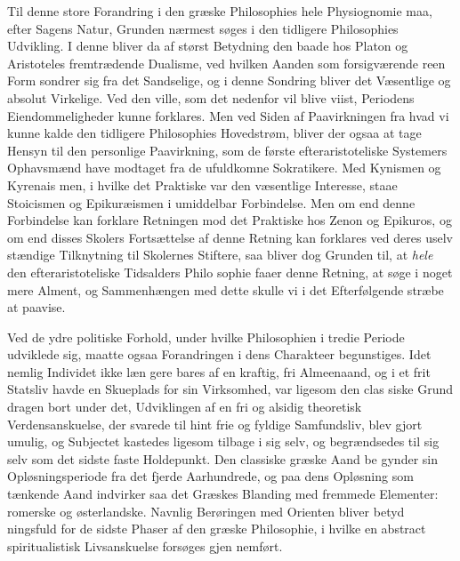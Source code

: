 \documentclass[12pt,a4paper]{book}
\begin{document}
Til denne store Forandring i den græske Philosophies
hele Physiognomie maa, efter Sagens Natur, Grunden nærmest
søges i den tidligere Philosophies Udvikling. I denne bliver
da af størst Betydning den baade hos Platon og Aristoteles
fremtrædende Dualisme, ved hvilken Aanden som forsigværende
reen Form sondrer sig fra det Sandselige, og i denne Sondring
bliver det Væsentlige og absolut Virkelige. Ved den ville,
som det nedenfor vil blive viist, Periodens Eiendommeligheder
kunne forklares. Men ved Siden af Paavirkningen fra hvad vi
kunne kalde den tidligere Philosophies Hovedstrøm, bliver der
ogsaa at tage Hensyn til den personlige Paavirkning, som de
første efteraristoteliske Systemers Ophavsmænd have modtaget
fra de ufuldkomne Sokratikere. Med Kynismen og Kyrenais\-%
men, i hvilke det Praktiske var den væsentlige Interesse, staae
Stoicismen og Epikuræismen i umiddelbar Forbindelse. Men
om end denne Forbindelse kan forklare Retningen mod det
Praktiske hos Zenon og Epikuros, og om end disses Skolers
Fortsættelse af denne Retning kan forklares ved deres uselv\-%
stændige Tilknytning til Skolernes Stiftere, saa bliver dog
Grunden til, at \emph{hele} den efteraristoteliske Tidsalders Philo\-%
sophie faaer denne Retning, at søge i noget mere Alment, og
Sammenhængen med dette skulle vi i det Efterfølgende stræbe
at paavise.

Ved de ydre politiske Forhold, under hvilke Philosophien
i tredie Periode udviklede sig, maatte ogsaa Forandringen i
dens Charakteer begunstiges. Idet nemlig Individet ikke læn\-%
gere bares af en kraftig, fri Almeenaand, og i et frit Statsliv
havde en Skueplads for sin Virksomhed, var ligesom den clas\-%
siske Grund dragen bort under det, Udviklingen af en fri og
alsidig theoretisk Verdensanskuelse, der svarede til hint frie
og fyldige Samfundsliv, blev gjort umulig, og Subjectet kastedes
ligesom tilbage i sig selv, og begrændsedes til sig selv som
det sidste faste Holdepunkt. Den classiske græske Aand be\-%
gynder sin Opløsningsperiode fra det fjerde Aarhundrede, og
paa dens Opløsning som tænkende Aand indvirker saa det
Græskes Blanding med fremmede Elementer: romerske og
østerlandske. Navnlig Berøringen med Orienten bliver betyd\-%
ningsfuld for de sidste Phaser af den græske Philosophie, i
hvilke en abstract spiritualistisk Livsanskuelse forsøges gjen\-%
nemført.
\end{document}
